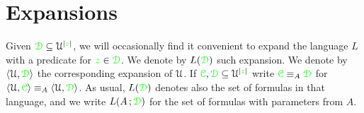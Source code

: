 \documentclass[creche.tex]{subfiles}
\begin{document}
\begin{comment}
La seguente proposizione giustifica la definizione di $p^{(\omega)}$, la dimostrazione \`e immediata.

\begin{proposition}\label{prop_p^omega_Morley}
Sia $p(x)\in S(\U)$ un tipo globale $A\jj$invariante. Allora le seguenti affermazioni sono equivalenti
\begin{itemize}
\item[1.]$\<c_i:i<\omega\>$ \`e una sequenze di Morley di $p$ su $A$;
\item[2.] $\<c_i:i<\omega\>\models p^{(\omega)}|_A$
\end{itemize}
\end{proposition}

La seguente proposizione torner\`a utile nei prossimi paragrafi, si osservi che  non \`e una conseguenza della proposizione~\ref{prop_p^omega_Morley} perch\'e qui l'invarianza su $A$ non \`e tra le ipotesi.

\begin{proposition}
Sia $p(x)\in S(\U)$ un tipo globale invariante ed $A$ un insieme arbitrario. Allora ogni $\<c_i:i<\omega\>\models p^{(\omega)}|_A$ \`e una sequenza di indiscernibili su $A$.
\end{proposition}


\begin{proof}
\`E sufficiente verificare che se $\<c_i:i<\omega\>\models p^{(\omega)}|_A$ allora $c_{i_0},\dots,c_{i_n}\models p^{(n+1)}|_A$ per ogni $i_0<\dots<i_n<\omega$. 
\end{proof}



\end{comment}
\section{Expansions}
\label{expansions}

\def\medrel#1{\parbox[t]{6ex}{$\displaystyle\hfil #1$}}
\def\ceq#1#2#3{\parbox[t]{15ex}{$\displaystyle #1$}\medrel{#2}{$\displaystyle #3$}}

Given ${\color{green}\EuScript D}\subseteq\EuScript U^{|{\color{green} z}|}$, we will occasionally find it convenient to expand the language $L$ with a predicate for ${\color{green} z}\in{\color{green}\EuScript D}$. We denote by \emph{$L({\color{green}\EuScript D})$\/} such expansion. We denote by $\langle\EuScript U,{\color{green}\EuScript D}\rangle$ the corresponding expansion of $\EuScript U$. If  ${\color{green}\EuScript C},{\color{green}\EuScript D}\subseteq\EuScript U^{|{\color{green} z}|}$ write ${\color{green}\EuScript C}\equiv_A{\color{green}\EuScript D}$ for $\langle\EuScript U,{\color{green}\EuScript C}\rangle\equiv_A\langle\EuScript U,{\color{green}\EuScript D}\rangle$. As usual, $L({\color{green}\EuScript D})$ denotes also the set of formulas in that language, and we write  $L(A\,;{\color{green}\EuScript D})$ for the set of formulas with parameters from $A$.
\end{document}
